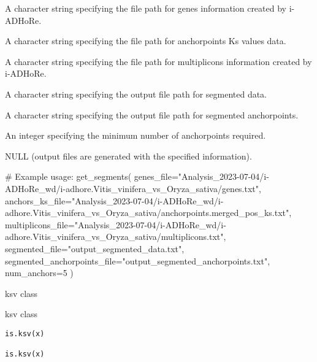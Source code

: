 \documentclass[a4paper]{book}
\begin{document}
\begin{Arguments}
\begin{ldescription}
\item[\code{genes\_file}] A character string specifying the file path for genes information created by i-ADHoRe.

\item[\code{anchors\_ks\_file}] A character string specifying the file path for anchorpoints Ks values data.

\item[\code{multiplicons\_file}] A character string specifying the file path for multiplicons information created by i-ADHoRe.

\item[\code{segmented\_file}] A character string specifying the output file path for segmented data.

\item[\code{segmented\_anchorpoints\_file}] A character string specifying the output file path for segmented anchorpoints.

\item[\code{num\_anchors}] An integer specifying the minimum number of anchorpoints required.
\end{ldescription}
\end{Arguments}
%
\begin{Value}
NULL (output files are generated with the specified information).
\end{Value}
%
\begin{Examples}
\begin{ExampleCode}
# Example usage:
get_segments(
    genes_file="Analysis_2023-07-04/i-ADHoRe_wd/i-adhore.Vitis_vinifera_vs_Oryza_sativa/genes.txt",
    anchors_ks_file="Analysis_2023-07-04/i-ADHoRe_wd/i-adhore.Vitis_vinifera_vs_Oryza_sativa/anchorpoints.merged_pos_ks.txt",
    multiplicons_file="Analysis_2023-07-04/i-ADHoRe_wd/i-adhore.Vitis_vinifera_vs_Oryza_sativa/multiplicons.txt",
    segmented_file="output_segmented_data.txt",
    segmented_anchorpoints_file="output_segmented_anchorpoints.txt",
    num_anchors=5
)
\end{ExampleCode}
\end{Examples}
%
\begin{Description}\relax
ksv class

ksv class
\end{Description}
%
\begin{Usage}
\begin{verbatim}
is.ksv(x)

is.ksv(x)
\end{verbatim}
\end{Usage}
\end{document}
